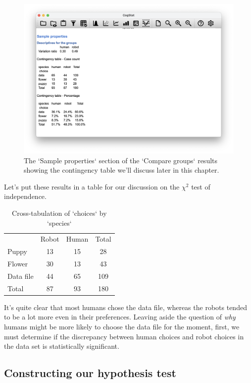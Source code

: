 \documentclass[
]{book}
\theoremstyle{definition}
\theoremstyle{definition}
\theoremstyle{definition}
\theoremstyle{definition}
\theoremstyle{remark}
\begin{document}
\begin{figure}

{\centering \includegraphics[width=0.66\linewidth]{resources/image/cogstatchapek9descriptives} 

}

\caption{The `Sample properties` section of the `Compare groups` results showing the contingency table we'll discuss later in this chapter.}\label{fig:cogstatchapek9descriptives}
\end{figure}

Let's put these results in a table for our discussion on the \(\chi^2\) test of independence.

\begin{table}[!h]

\caption{\label{tab:unnamed-chunk-38}Cross-tabulation of `choices` by `species`}
\centering
\begin{tabular}[t]{lccc}
\toprule
 & Robot & Human & Total\\
Puppy & 13 & 15 & 28\\
Flower & 30 & 13 & 43\\
Data file & 44 & 65 & 109\\
Total & 87 & 93 & 180\\
\bottomrule
\end{tabular}
\end{table}

It's quite clear that most humans chose the data file, whereas the robots tended to be a lot more even in their preferences. Leaving aside the question of \emph{why} humans might be more likely to choose the data file for the moment, first, we must determine if the discrepancy between human choices and robot choices in the data set is statistically significant.

\hypertarget{constructing-our-hypothesis-test}{%
\subsection{Constructing our hypothesis test}\label{constructing-our-hypothesis-test}}
\end{document}
